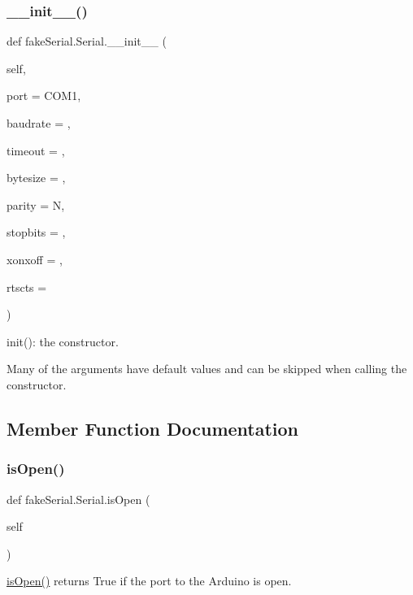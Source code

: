\subsubsection{\texorpdfstring{\_\_init\_\_()}{\_\_init\_\_()}}
{\footnotesize\ttfamily def fake\+Serial.\+Serial.\+\_\+\+\_\+init\+\_\+\+\_\+ (\begin{DoxyParamCaption}\item[{}]{self,  }\item[{}]{port = {\ttfamily \textquotesingle{}COM1\textquotesingle{}},  }\item[{}]{baudrate = {},  }\item[{}]{timeout = {},  }\item[{}]{bytesize = {},  }\item[{}]{parity = {\ttfamily \textquotesingle{}N\textquotesingle{}},  }\item[{}]{stopbits = {},  }\item[{}]{xonxoff = {},  }\item[{}]{rtscts = {} }\end{DoxyParamCaption})}



init()\+: the constructor. 

Many of the arguments have default values and can be skipped when calling the constructor. 

\subsection{Member Function Documentation}
\mbox{\label{classfake_serial_1_1_serial_a69cc2297e7c5bfb87de4df789774f3a2}} 
\subsubsection{\texorpdfstring{isOpen()}{isOpen()}}
{\footnotesize\ttfamily def fake\+Serial.\+Serial.\+is\+Open (\begin{DoxyParamCaption}\item[{}]{self }\end{DoxyParamCaption})}



\mbox{\hyperlink{classfake_serial_1_1_serial_a69cc2297e7c5bfb87de4df789774f3a2}{is\+Open()}} returns True if the port to the Arduino is open. 

